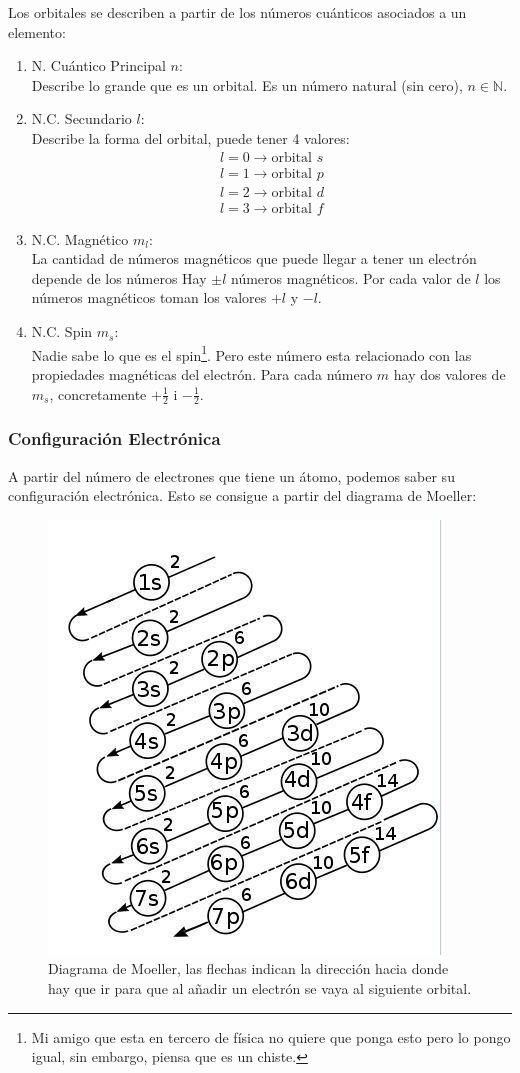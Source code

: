 \documentclass[arial,a4paper,print]{article}
\begin{document}
Los orbitales se describen a partir de los números cuánticos asociados a un elemento:
\begin{enumerate}
\item N. Cuántico Principal $n$:\\
Describe lo grande que es un orbital. Es un número natural (sin cero), $n\in\mathbb{N}$. 

\item N.C. Secundario $l$:\\
Describe la forma del orbital, puede tener 4 valores:
\begin{align*}
	l = 0 \rightarrow \text{orbital } s \\
	l = 1 \rightarrow \text{orbital } p \\
	l = 2 \rightarrow \text{orbital } d \\
	l = 3 \rightarrow \text{orbital } f 
\end{align*}

\item N.C. Magnético $m_{l}$:\\
La cantidad de números magnéticos que puede llegar a tener un electrón depende de los números Hay $\pm l$ números magnéticos. Por cada valor de $l$ los números magnéticos toman los valores $+l$ y $-l$. 

\item N.C. Spin $m_{s}$:\\
Nadie sabe lo que es el spin\footnote{Mi amigo que esta en tercero de física no quiere que ponga esto pero lo pongo igual, sin embargo, piensa que es un chiste.}. Pero este número esta relacionado con las propiedades magnéticas del electrón. Para cada número $m$ hay dos valores de $m_{s}$, concretamente $+\frac{1}{2}$ i $-\frac12$. 
\end{enumerate}

\subsubsection{Configuración Electrónica}
A partir del número de electrones que tiene un átomo, podemos saber su configuración electrónica. Esto se consigue a partir del diagrama de Moeller:
\begin{figure}[H]
	\centering
	\includegraphics[width=0.2\linewidth]{figures/moeller}
	\caption{Diagrama de Moeller, las flechas indican la dirección hacia donde hay que ir para que al añadir un electrón se vaya al siguiente orbital.}
	\label{fig:moeller}
\end{figure}
\end{document}
